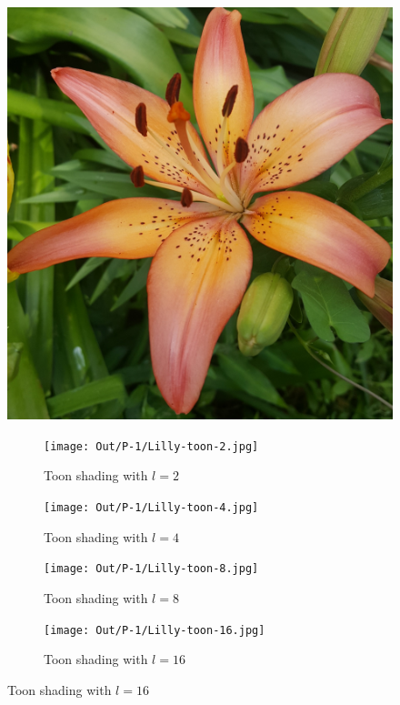 \documentclass[dvipsnames]{article}
\begin{document}
\begin{figure}[H]
	\centering\includegraphics[width=.5\linewidth]{Images/P-1/Lilly.jpg}
	\caption{Original Lilly.jpg}

	\begin{subfigure}{.33\linewidth}
		\centering\texttt{[image: Out/P-1/Lilly-toon-2.jpg]}
		\caption{Toon shading with $l = 2$}
	\end{subfigure}
	\begin{subfigure}{.33\linewidth}
		\centering\texttt{[image: Out/P-1/Lilly-toon-4.jpg]}
		\caption{Toon shading with $l = 4$}
	\end{subfigure}
	\begin{subfigure}{.33\linewidth}
		\centering\texttt{[image: Out/P-1/Lilly-toon-8.jpg]}
		\caption{Toon shading with $l = 8$}
	\end{subfigure}
	\begin{subfigure}{.33\linewidth}
		\centering\texttt{[image: Out/P-1/Lilly-toon-16.jpg]}
		\caption{Toon shading with $l = 16$}
	\end{subfigure}
\end{figure}
\end{document}
